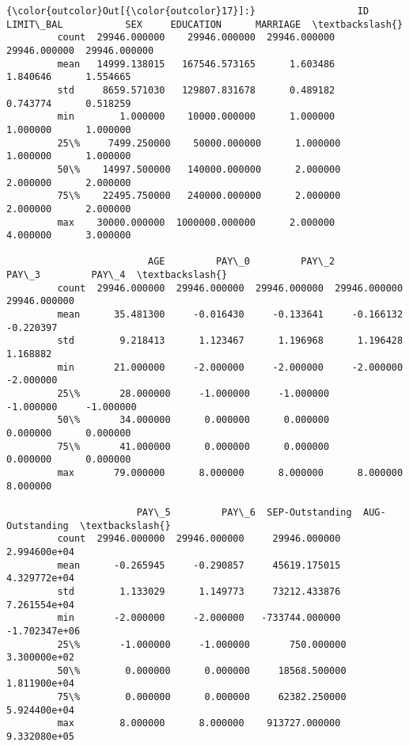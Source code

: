 \documentclass[11pt]{article}
\begin{document}
\begin{Verbatim}[commandchars=\\\{\}]
{\color{outcolor}Out[{\color{outcolor}17}]:}                  ID       LIMIT\_BAL           SEX     EDUCATION      MARRIAGE  \textbackslash{}
         count  29946.000000    29946.000000  29946.000000  29946.000000  29946.000000   
         mean   14999.138015   167546.573165      1.603486      1.840646      1.554665   
         std     8659.571030   129807.831678      0.489182      0.743774      0.518259   
         min        1.000000    10000.000000      1.000000      1.000000      1.000000   
         25\%     7499.250000    50000.000000      1.000000      1.000000      1.000000   
         50\%    14997.500000   140000.000000      2.000000      2.000000      2.000000   
         75\%    22495.750000   240000.000000      2.000000      2.000000      2.000000   
         max    30000.000000  1000000.000000      2.000000      4.000000      3.000000   
         
                         AGE         PAY\_0         PAY\_2         PAY\_3         PAY\_4  \textbackslash{}
         count  29946.000000  29946.000000  29946.000000  29946.000000  29946.000000   
         mean      35.481300     -0.016430     -0.133641     -0.166132     -0.220397   
         std        9.218413      1.123467      1.196968      1.196428      1.168882   
         min       21.000000     -2.000000     -2.000000     -2.000000     -2.000000   
         25\%       28.000000     -1.000000     -1.000000     -1.000000     -1.000000   
         50\%       34.000000      0.000000      0.000000      0.000000      0.000000   
         75\%       41.000000      0.000000      0.000000      0.000000      0.000000   
         max       79.000000      8.000000      8.000000      8.000000      8.000000   
         
                       PAY\_5         PAY\_6  SEP-Outstanding  AUG-Outstanding  \textbackslash{}
         count  29946.000000  29946.000000     29946.000000     2.994600e+04   
         mean      -0.265945     -0.290857     45619.175015     4.329772e+04   
         std        1.133029      1.149773     73212.433876     7.261554e+04   
         min       -2.000000     -2.000000   -733744.000000    -1.702347e+06   
         25\%       -1.000000     -1.000000       750.000000     3.300000e+02   
         50\%        0.000000      0.000000     18568.500000     1.811900e+04   
         75\%        0.000000      0.000000     62382.250000     5.924400e+04   
         max        8.000000      8.000000    913727.000000     9.332080e+05   
         

\end{Verbatim}
\end{document}
